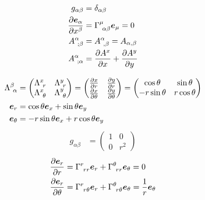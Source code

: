 \documentclass[uplatex,dvipdfmx,a4paper,11pt]{jlreq}
\newcommand{\ee}{\bm{e}}
\theoremstyle{definition}
\begin{document}
\begin{example}[デカルト座標]
  \begin{align}
    g_{\alpha\beta}             & = \delta_{\alpha\beta}                   \\
    \diffp{\ee_\alpha}{x^\beta} & = \Gamma^\mu_{\ \alpha\beta}\ee_\mu = 0  \\
    A^\alpha_{\ ;\beta}         & = A^\alpha_{\ ,\beta} = A_{\alpha,\beta} \\
    A^\alpha_{\ ;\alpha}        & = \diffp{A^x}{x} + \diffp{A^y}{y}
  \end{align}
\end{example}
\begin{example}[極座標]
  \begin{align}
    \Lambda_{\ \alpha}^\beta & =
    \begin{pmatrix}
      \Lambda_{\ r}^{x}      & \Lambda_{\ r}^{y}      \\
      \Lambda_{\ \theta}^{x} & \Lambda_{\ \theta}^{y}
    \end{pmatrix}
    =
    \begin{pmatrix}
      \diffp{x}{r}      & \diffp{y}{r}      \\
      \diffp{x}{\theta} & \diffp{y}{\theta}
    \end{pmatrix}
    =
    \begin{pmatrix}
      \cos\theta   & \sin\theta  \\
      -r\sin\theta & r\cos\theta
    \end{pmatrix}                                        \\
    \ee_r                    & = \cos\theta\ee_x + \sin\theta\ee_y    \\
    \ee_\theta               & = -r\sin\theta\ee_x + r\cos\theta\ee_y
  \end{align}
  \begin{align}
    g_{\alpha\beta} & = \begin{pmatrix}
                          1 & 0   \\
                          0 & r^2
                        \end{pmatrix}
  \end{align}
  \begin{align}
    \diffp{\ee_r}{r}           & = \Gamma^{r}_{\ rr}\ee_r + \Gamma^{\theta}_{\ rr}\ee_\theta = 0                                 \\
    \diffp{\ee_r}{\theta}      & = \Gamma^{r}_{\ r\theta}\ee_r + \Gamma^{\theta}_{\ r\theta}\ee_\theta = \frac{1}{r}\ee_\theta   \\

\end{align}
\end{example}
\end{document}
